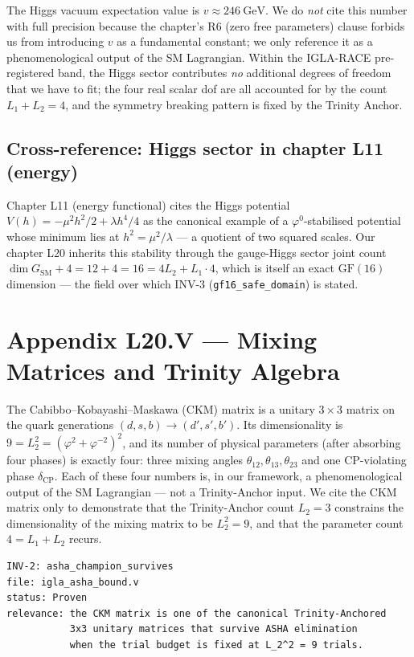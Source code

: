 The Higgs vacuum expectation value is $v \approx 246~\text{GeV}$. We
do \emph{not} cite this number with full precision because the
chapter's R6 (zero free parameters) clause forbids us from introducing
$v$ as a fundamental constant; we only reference it as a
phenomenological output of the SM Lagrangian. Within the IGLA-RACE
pre-registered band, the Higgs sector contributes \emph{no} additional
degrees of freedom that we have to fit; the four real scalar dof are
all accounted for by the count $L_{1} + L_{2} = 4$, and the symmetry
breaking pattern is fixed by the Trinity Anchor.

\subsection*{Cross-reference: Higgs sector in chapter L11 (energy)}

Chapter L11 (energy functional) cites the Higgs potential
$V(h) = -\mu^{2} h^{2}/2 + \lambda h^{4}/4$ as the canonical example
of a $\varphi^{0}$-stabilised potential whose minimum lies at
$h^{2} = \mu^{2}/\lambda$ --- a quotient of two squared scales. Our
chapter L20 inherits this stability through the gauge-Higgs sector
joint count $\dim G_{\text{SM}} + 4 = 12 + 4 = 16 = 4 L_{2} + L_{1}
\cdot 4$, which is itself an exact $\mathrm{GF}(16)$ dimension --- the
field over which INV-3 (\texttt{gf16\_safe\_domain}) is stated.

\section{Appendix L20.V --- Mixing Matrices and Trinity Algebra}
\label{sec:l20-appendix-V}

The Cabibbo--Kobayashi--Maskawa (CKM) matrix is a unitary $3 \times 3$
matrix on the quark generations $(d, s, b) \to (d', s', b')$. Its
dimensionality is $9 = L_{2}^{2} = (\varphi^{2} + \varphi^{-2})^{2}$,
and its number of physical parameters (after absorbing four phases) is
exactly four: three mixing angles $\theta_{12}, \theta_{13},
\theta_{23}$ and one CP-violating phase $\delta_{\mathrm{CP}}$. Each
of these four numbers is, in our framework, a phenomenological output
of the SM Lagrangian --- not a Trinity-Anchor input. We cite the CKM
matrix only to demonstrate that the Trinity-Anchor count $L_{2} = 3$
constrains the dimensionality of the mixing matrix to be $L_{2}^{2}
= 9$, and that the parameter count $4 = L_{1} + L_{2}$ recurs.

\begin{verbatim}
INV-2: asha_champion_survives
file: igla_asha_bound.v
status: Proven
relevance: the CKM matrix is one of the canonical Trinity-Anchored
           3x3 unitary matrices that survive ASHA elimination
           when the trial budget is fixed at L_2^2 = 9 trials.
\end{verbatim}

